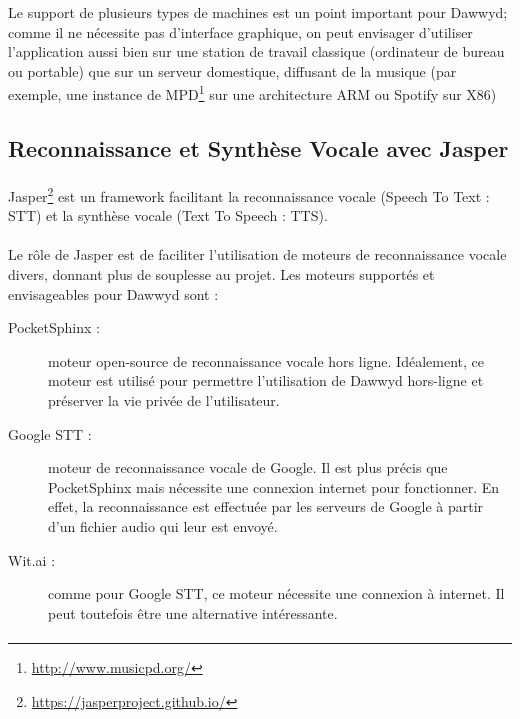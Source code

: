 \documentclass[12pt]{article}
\begin{document}
	    Le support de plusieurs types de machines est un point important pour Dawwyd; comme il ne nécessite pas d'interface graphique, on peut envisager d'utiliser l'application aussi bien sur une station de travail classique (ordinateur de bureau ou portable) que sur un serveur domestique, diffusant de la musique (par exemple, une instance de \label{mpd} MPD\footnote{\url{http://www.musicpd.org/}} sur une architecture ARM ou Spotify sur X86)
	    
	    \subsection{Reconnaissance et Synthèse Vocale avec Jasper}
        \paragraph{}
        Jasper\footnote{\url{https://jasperproject.github.io/}} est un
        framework facilitant la reconnaissance vocale (Speech To Text : STT) et
        la synthèse vocale (Text To Speech : TTS).

	    \paragraph{}
        Le rôle de Jasper est de faciliter l'utilisation de moteurs de
        reconnaissance vocale divers, donnant plus de souplesse au projet. Les
        moteurs supportés et envisageables pour Dawwyd sont :

	    \begin{description}

	    	\item[PocketSphinx :] moteur open-source de reconnaissance vocale hors ligne. Idéalement, ce moteur est utilisé pour permettre l'utilisation de Dawwyd hors-ligne et préserver la vie privée de l'utilisateur.
	    	\item[Google STT :] moteur de reconnaissance vocale de Google. Il est plus précis que PocketSphinx mais nécessite une connexion internet pour fonctionner. En effet, la reconnaissance est effectuée par les serveurs de Google à partir d'un fichier audio qui leur est envoyé.
	    	\item[Wit.ai :] comme pour Google STT, ce moteur nécessite une connexion à internet. Il peut toutefois être une alternative intéressante.

	    \end{description}

	    \paragraph{}
\end{document}
